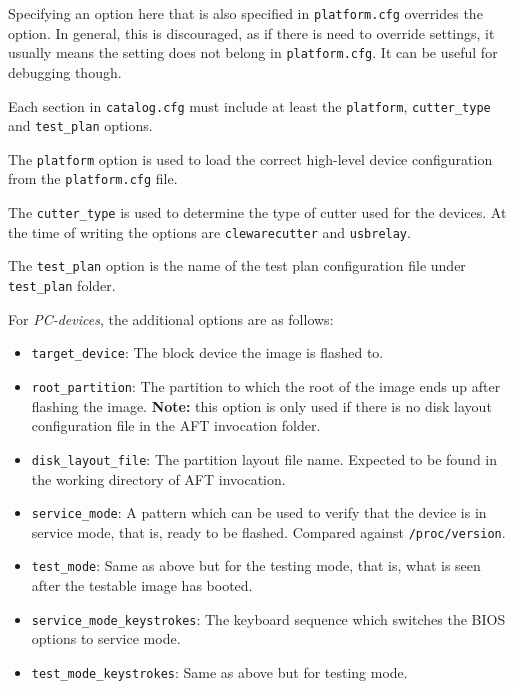 \documentclass[a4paper,11pt]{article}
\newcommand{\note}{\textbf{Note: }}
\newcommand{\cmd}[1]{\texttt{#1}}
\begin{document}
Specifying an option here that is also specified in \cmd{platform.cfg} overrides the option. In general, this is discouraged, as if there is need to override settings, it usually means the setting does not belong in \cmd{platform.cfg}. It can be useful for debugging though.

Each section in \cmd{catalog.cfg} must include at least the \cmd{platform}, \cmd{cutter\_type} and \cmd{test\_plan} options.

The \cmd{platform} option is used to load the correct high-level device configuration from the \cmd{platform.cfg} file. 

The \cmd{cutter\_type} is used to determine the type of cutter used for the devices. At the time of writing the options are \cmd{clewarecutter} and \cmd{usbrelay}.

The \cmd{test\_plan} option is the name of the test plan configuration file under \cmd{test\_plan} folder.

For \emph{PC-devices}, the additional options are as follows:
\begin{itemize}
\item \cmd{target\_device}: The block device the image is flashed to.

\item \cmd{root\_partition}: The partition to which the root of the image ends up after flashing the image. \note this option is only used if there is no disk layout configuration file in the AFT invocation folder.

\item \cmd{disk\_layout\_file}: The partition layout file name. Expected to be found in the working directory of AFT invocation.

\item \cmd{service\_mode}: A pattern which can be used to verify that the device is in service mode, that is, ready to be flashed. Compared against \cmd{/proc/version}.

\item \cmd{test\_mode}: Same as above but for the testing mode, that is, what is seen after the testable image has booted.

\item \cmd{service\_mode\_keystrokes}: The keyboard sequence which switches the BIOS options to service mode.

\item \cmd{test\_mode\_keystrokes}: Same as above but for testing mode.
\end{itemize}
\end{document}
